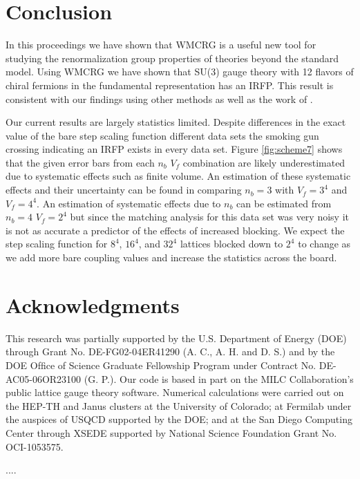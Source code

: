 \documentclass{PoS}
\begin{document}
\section{Conclusion}
\label{sec:conclusion}
In this proceedings we have shown that WMCRG is a useful new tool for studying the renormalization group properties of theories beyond the standard model.
Using WMCRG we have shown that SU(3) gauge theory with 12 flavors of chiral fermions in the fundamental representation has an IRFP.
This result is consistent with our findings using other methods as well as the work of \cite{}.


Our current results are largely statistics limited.
Despite differences in the exact value of the bare step scaling function different data sets the smoking gun crossing indicating an IRFP exists in every data set.
Figure \ref{fig:scheme7} shows that the given error bars from each $n_b$ $V_f$ combination are likely underestimated due to systematic effects such as finite volume.
An estimation of these systematic effects and their uncertainty can be found in comparing $n_b=3$ with $V_f=3^4$ and $V_f=4^4$.
An estimation of systematic effects due to $n_b$ can be estimated from $n_b=4$ $V_f=2^4$ but since the matching analysis for this data set was very noisy it is not as accurate a predictor of the effects of increased blocking.
We expect the step scaling function for  $8^4$, $16^4$, and $32^4$ lattices blocked down to $2^4$ to change as we add more bare coupling values and increase the statistics across the board.

\section{Acknowledgments}
\label{sec:acknowledgments}
This research was partially supported by the U.S. Department of Energy (DOE) through Grant No. DE-FG02-04ER41290 (A. C., A. H. and D. S.) and by the DOE Ofﬁce of Science Graduate Fellowship Program under Contract No. DE-AC05-06OR23100 (G. P.). 
Our code is based in part on the MILC Collaboration’s public lattice gauge theory software.
Numerical calculations were carried out on the HEP-TH and Janus clusters at the University of Colorado; at Fermilab under the auspices of USQCD supported by the DOE; and at the San Diego Computing Center through XSEDE supported by National Science Foundation Grant No. OCI-1053575.

\begin{thebibliography}{99}
....

\end{thebibliography}
\end{document}
